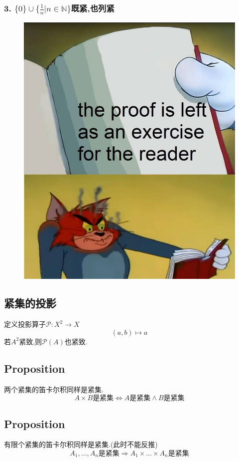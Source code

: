 \documentclass[12pt, a4paper, oneside]{ctexbook}
\begin{document}
  \subsubsection{3.  $\{0\}\cup \{\frac{1}{n}|n\in\mathbb{N}\}$既紧,也列紧}
  \begin{figure}[H]%
    \centering
    \includegraphics[scale=0.2]{proofforreader.jpg}
  \end{figure}
  \subsection{紧集的投影}
  定义投影算子$\mathcal{P}:X^2\rightarrow X$
  $$
  (a,b)\mapsto a
  $$
  若$A^2$紧致,则$\mathcal{P}(A)$也紧致.
  \subsection{Proposition}
  两个紧集的笛卡尔积同样是紧集.
  $$
  A\times B\text{是紧集}\Leftrightarrow A\text{是紧集}\land B\text{是紧集}
  $$
  \subsection{Proposition}
  有限个紧集的笛卡尔积同样是紧集.(此时不能反推)
  $$
  A_1,\dots,A_n\text{是紧集}\Rightarrow A_1\times \dots\times A_n\text{是紧集}
  $$
\end{document}
